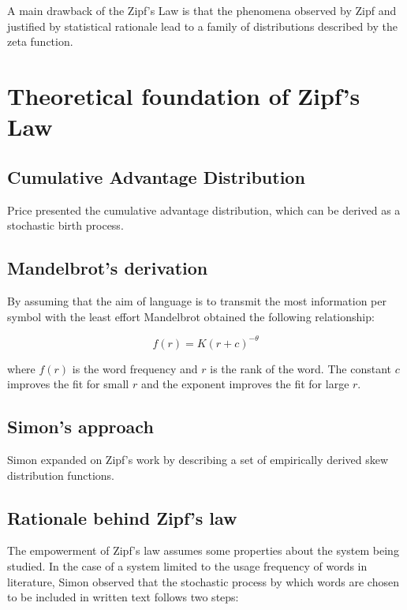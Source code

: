 \documentclass{article} \usepackage{hyperref} \usepackage{graphicx}
\begin{document}
A main drawback of the Zipf's Law is that the phenomena observed by
Zipf and justified by statistical rationale lead to a family of
distributions described by the zeta function.

\section{Theoretical foundation of Zipf's Law}
\subsection{Cumulative Advantage Distribution}

Price presented the cumulative advantage distribution, which can be
derived as a stochastic birth process.

\subsection{Mandelbrot's derivation}

By assuming that the aim of language is to transmit the most
information per symbol with the least effort Mandelbrot obtained the
following relationship:

\begin{equation}
  \label{simple_equation} f(r) = K(r+c)^{-\theta}
\end{equation}

where $f(r)$ is the word frequency and $r$ is the rank of the word. The
constant $c$ improves the fit for small $r$ and the exponent improves the
fit for large $r$.

\subsection{Simon's approach}

Simon expanded on Zipf's work by describing a set of empirically
derived skew distribution functions.

\subsection{Rationale behind Zipf's law}

The empowerment of Zipf's law assumes some properties about the system
being studied. In the case of a system limited to the usage frequency
of words in literature, Simon observed that the stochastic process by
which words are chosen to be included in written text follows two
steps:
\end{document}
